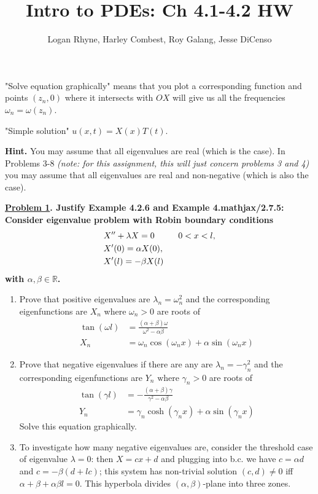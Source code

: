 \documentclass{article}
\title{Intro to PDEs: Ch 4.1-4.2 HW}
\author{Logan Rhyne, Harley Combest, Roy Galang, Jesse DiCenso}
\theoremstyle{definition}
\newenvironment{boldenv}{\bfseries\boldmath}{}
\newcommand{\R}{\mathbb{R}}
\begin{document}
\maketitle

"Solve equation graphically" means that you plot a corresponding function and points $(z_n , 0)$ where it intersects with $OX$ will give us all the frequencies $\omega_n = \omega (z_n)$.

"Simple solution" $u(x,t)=X(x)T(t)$.

\textbf{Hint.} You may assume that all eigenvalues are real (which is the case). In Problems 3-8 \emph{(note: for this assignment, this will just concern problems 3 and 4)} you may assume that all eigenvalues are real and non-negative (which is also the case).

\begin{boldenv}
    \underline{Problem 1}. Justify Example 4.2.6 and Example 4.mathjax/2.7.5: Consider eigenvalue problem with Robin boundary conditions
    \begin{align}
        &X''+\lambda X=0 \mkern 50mu 0<x<l,\\
        &X'(0)=\alpha X(0),\\
        &X'(l)=-\beta X(l)
    \end{align}
    with $\alpha, \beta \in \R$. \begin{enumerate}
        \item Prove that positive eigenvalues are $\lambda_n = \omega_n^2$ and the corresponding eigenfunctions are $X_n$ where $\omega_n > 0$ are roots of
        \begin{align}
            \tan{(\omega l)} &= \frac{(\alpha + \beta)\omega}{\omega^2 - \alpha \beta}\\
            X_n &= \omega_n \cos{(\omega_n x)} + \alpha \sin{(\omega_n x)}
        \end{align}

        \item Prove that negative eigenvalues if there are any are $\lambda_n = -\gamma_n^2$ and the corresponding eigenfunctions are $Y_n \text{ where } \gamma_n > 0$ are roots of
        \begin{align}
            \tan{(\gamma l)} &= -\frac{(\alpha + \beta)\gamma}{\gamma^2 - \alpha \beta}\\
            Y_n &= \gamma_n \cosh{(\gamma_n x)} + \alpha \sin{(\gamma_n x)}
        \end{align}
        Solve this equation graphically.

        \item To investigate how many negative eigenvalues are, consider the threshold case of eigenvalue $\lambda = 0$: then $X = cx+d$ and plugging into b.c. we have $c=\alpha d$ and $c=-\beta (d+lc)$; this system has non-trivial solution $(c,d) \neq 0$ iff $\alpha + \beta + \alpha \beta l =0$. This hyperbola divides $(\alpha , \beta)$-plane into three zones.


\end{enumerate}
\end{boldenv}
\end{document}

